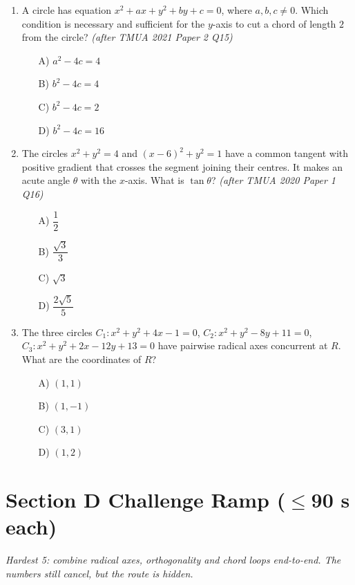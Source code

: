 \documentclass[11pt,a4paper]{article}
\begin{document}
\begin{enumerate}
\item A circle has equation $x^2+ax+y^2+by+c=0$, where $a,b,c\neq0$. Which condition is necessary and sufficient for the $y$-axis to cut a chord of length $2$ from the circle? \textit{\small(after TMUA 2021 Paper 2 Q15)}
\begin{itemize}
\item[A)] $a^2-4c=4$
\item[B)] $b^2-4c=4$
\item[C)] $b^2-4c=2$
\item[D)] $b^2-4c=16$
\end{itemize}

\item The circles $x^2+y^2=4$ and $(x-6)^2+y^2=1$ have a common tangent with positive gradient that crosses the segment joining their centres. It makes an acute angle $\theta$ with the $x$-axis. What is $\tan\theta$? \textit{\small(after TMUA 2020 Paper 1 Q16)}
\begin{itemize}[itemsep=5pt]
\item[A)] $\dfrac12$
\item[B)] $\dfrac{\sqrt3}{3}$
\item[C)] $\sqrt3$
\item[D)] $\dfrac{2\sqrt5}{5}$
\end{itemize}

\item The three circles $C_1:x^2+y^2+4x-1=0$, $C_2:x^2+y^2-8y+11=0$, $C_3:x^2+y^2+2x-12y+13=0$ have pairwise radical axes concurrent at $R$. What are the coordinates of $R$?
\begin{itemize}
\item[A)] $(1,1)$
\item[B)] $(1,-1)$
\item[C)] $(3,1)$
\item[D)] $(1,2)$
\end{itemize}

\end{enumerate}

\section*{Section D \quad Challenge Ramp \hfill{\normalfont\small($\leq$90 s each)}}

\noindent\textit{Hardest 5: combine radical axes, orthogonality and chord loops end-to-end. The numbers still cancel, but the route is hidden.}
\end{document}

